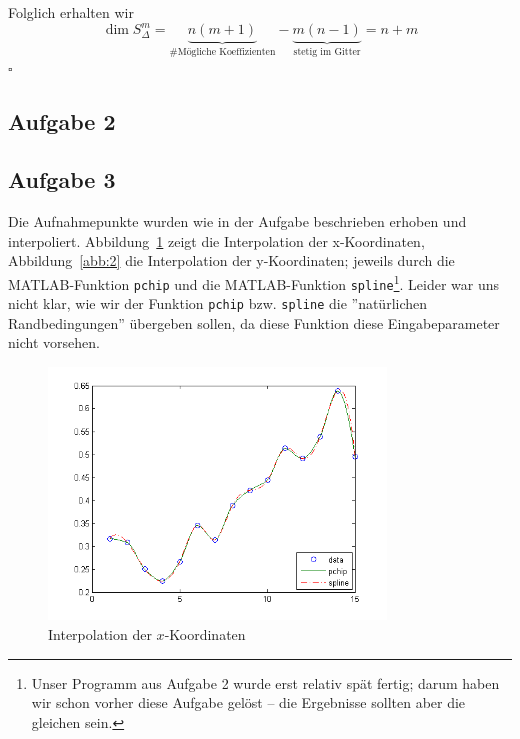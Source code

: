 \documentclass[11pt,a4paper,ngerman]{article}
\begin{document}
Folglich erhalten wir
\begin{equation*}
    \dim S_\Delta^m = \underbrace{n(m+1)}_\text{\#Mögliche Koeffizienten} - \underbrace{m(n-1)}_\text{stetig im Gitter} = n + m
\end{equation*}
\mbox{}\hfill$\square$


\subsection*{Aufgabe 2}


\subsection*{Aufgabe 3}
Die Aufnahmepunkte wurden wie in der Aufgabe beschrieben erhoben und interpoliert. Abbildung~\ref{abb:1} zeigt die Interpolation der x-Koordinaten, Abbildung~\ref{abb:2} die Interpolation der y-Koordinaten; jeweils durch  die MATLAB-Funktion \texttt{pchip} und die MATLAB-Funktion \texttt{spline}\footnote{Unser Programm aus Aufgabe 2 wurde erst relativ spät fertig; darum haben wir schon vorher diese Aufgabe gelöst -- die Ergebnisse sollten aber die gleichen sein.}.
Leider war uns nicht klar, wie wir der Funktion \texttt{pchip} bzw. \texttt{spline} die ''natürlichen Randbedingungen'' übergeben sollen, da diese Funktion diese Eingabeparameter nicht vorsehen.

\begin{figure}[h]
\centering
\includegraphics[width=0.8\textwidth]{plotX.png}
\caption{Interpolation der $x$-Koordinaten\label{abb:1}}
\end{figure}
\end{document}
